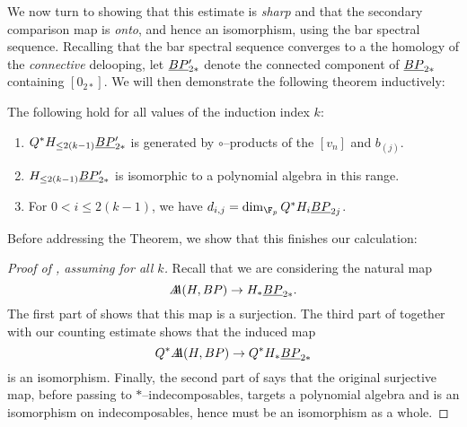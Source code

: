 We now turn to showing that this estimate is \emph{sharp} and that the secondary comparison map is \emph{onto}, and hence an isomorphism, using the bar spectral sequence.  Recalling that the bar spectral sequence converges to a the homology of the \emph{connective} delooping, let $\underline{\smash{BP}}_{2*}'$ denote the connected component of $\underline{\smash{BP}}_{2*}$ containing $[0_{2*}]$.  We will then demonstrate the following theorem inductively:
\begin{theorem}\label{HFpBPCooperationsInduction}
The following hold for all values of the induction index $k$:
\begin{enumerate}
\item $Q^* H_{\le 2(k-1)} \underline{\smash{BP}}_{2*}'$ is generated by $\circ$--products of the $[v_n]$ and $b_{(j)}$.
\item $H_{\le 2(k-1)} \underline{\smash{BP}}_{2*}'$ is isomorphic to a polynomial algebra in this range.
\item For $0 < i \le 2(k-1)$, we have $d_{i,j} = \dim_{\F_p} Q^* H_i \OS{BP}{2j}$.
\end{enumerate}
\end{theorem}

\noindent Before addressing the Theorem, we show that this finishes our calculation:
\begin{proof}[{Proof of , assuming  for all $k$}]
Recall that we are considering the natural map \[A\!\!\!A(H, BP) \to H_* \underline{\smash{BP}}_{2*}.\]  The first part of  shows that this map is a surjection.  The third part of  together with our counting estimate shows that the induced map \[Q^* A\!\!\!A(H, BP) \to Q^* H_* \underline{\smash{BP}}_{2*}\] is an isomorphism.  Finally, the second part of  says that the original surjective map, before passing to $\ast$--indecomposables, targets a polynomial algebra and is an isomorphism on indecomposables, hence must be an isomorphism as a whole.
\end{proof}

